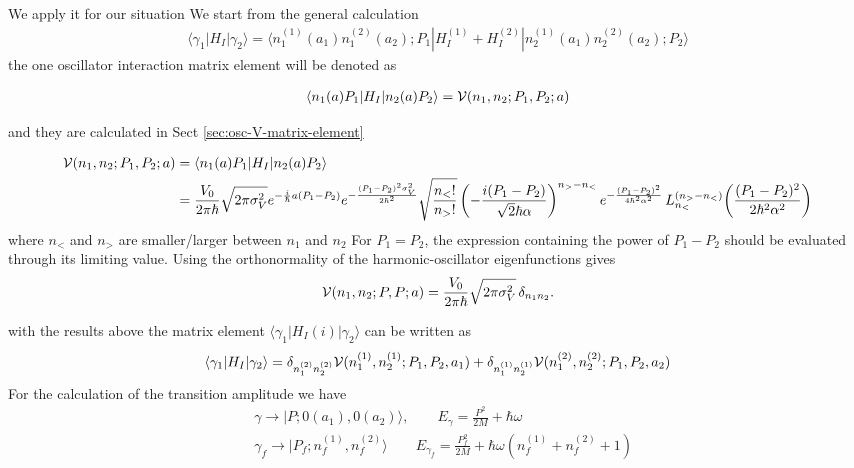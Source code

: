 We apply it for our situation
We start from the general calculation
\begin{align}
  \langle \gamma_1|H_I|\gamma_2\rangle = \langle n^{(1)}_1(a_1)n_1^{(2)}(a_2);P_1|H_{I}^{(1)}+H_{I}^{(2)}|n_2^{(1)}(a_1)n_2^{(2)}(a_2);P_2\rangle
\end{align}
the one oscillator interaction matrix element will be denoted as
\begin{importantbox}
  \begin{align}
    \langle n_1(a) P_1|H_I|n_2(a) P_2\rangle={\cal V}(n_1,n_2; P_1, P_2; a)\label{eq:osc-V-notation}
  \end{align}
\end{importantbox}
and they are calculated in Sect \ref{sec:osc-V-matrix-element}
\begin{importantbox}
  \begin{align}
    {\cal V}(n_1,n_2;P_1,P_2;a)&= \langle n_1(a) P_1|H_I|n_2(a) P_2\rangle  \nonumber\\
    &= \frac{V_0}{2\pi\hbar}\sqrt{{2\pi\sigma_V^2}} e^{-\frac{i}{\hbar}a(P_1-P_2)}e^{-\frac{(P_1-P_2)^2\sigma_V^2}{2\hbar^2}}\sqrt{\frac{n_<!}{n_>!}} \left(-\frac{i (P_1-P_2)  }{\sqrt{2}\hbar\alpha}\right)^{n_> - n_<} e^{-\frac{(P_1-P_2)^2 }{4\hbar^2\alpha^2}} \, L_{n_<}^{(n_> - n_<)}\!\left(\frac{(P_1-P_2)^2 }{2\hbar^2\alpha^2}\right)\label{eq:osc-V-n1n2-restated}
  \end{align}
  where $n_<$ and $n_>$ are smaller/larger between $n_1$ and $n_2$
  For $P_1=P_2$, the expression containing the power of $P_1-P_2$
  should be evaluated through its limiting value.  Using the
  orthonormality of the harmonic-oscillator eigenfunctions gives
  \begin{align}
    {\cal V}(n_1,n_2;P,P;a)
    = \frac{V_0}{2\pi\hbar}\sqrt{2\pi\sigma_V^2}\,
    \delta_{n_1n_2}.\label{eq:osc-V-n1n2-diag-restated}
  \end{align}
\end{importantbox}
with the results above the matrix element $ \langle \gamma_1|H_I{(i)}|\gamma_2\rangle$ can be written as
\begin{align}
  \langle \gamma_1|H_I|\gamma_2\rangle = \delta_{n_1^{(2)}n_2^{(2)}}{\cal V}(n_1^{(1)},n_2^{(1)};P_1,P_2,a_1)+\delta_{n_1^{(1)}n_2^{(1)}}{\cal V}(n_1^{(2)},n_2^{(2)};P_1,P_2,a_2)
\end{align}
For the calculation of the transition amplitude we have
\begin{align}
  &\gamma\rightarrow |P;0(a_1),0(a_2)\rangle,\qquad E_\gamma = \frac{P^2}{2M}+\hbar\omega\\
  & \gamma_f\rightarrow|P_f;n_f^{(1)},n_f^{(2)}\rangle\qquad E_{\gamma_f} = \frac{P_f^2}{2M}+\hbar\omega(n_f^{(1)}+n_f^{(2)}+1)
\end{align}
